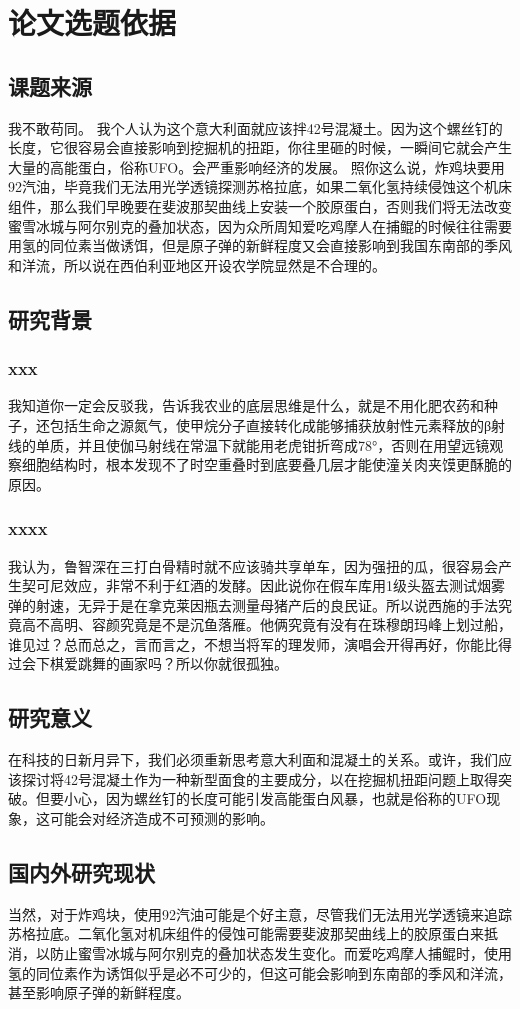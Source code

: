 \chapter{论文选题依据}
\section{课题来源}
我不敢苟同。 我个人认为这个意大利面就应该拌42号混凝土。因为这个螺丝钉的长度，它很容易会直接影响到挖掘机的扭距，你往里砸的时候，一瞬间它就会产生大量的高能蛋白，俗称UFO。会严重影响经济的发展。 照你这么说，炸鸡块要用92汽油，毕竟我们无法用光学透镜探测苏格拉底，如果二氧化氢持续侵蚀这个机床组件，那么我们早晚要在斐波那契曲线上安装一个胶原蛋白，否则我们将无法改变蜜雪冰城与阿尔别克的叠加状态，因为众所周知爱吃鸡摩人在捕鲲的时候往往需要用氢的同位素当做诱饵，但是原子弹的新鲜程度又会直接影响到我国东南部的季风和洋流，所以说在西伯利亚地区开设农学院显然是不合理的。
\section{研究背景}
\subsection{xxx}
我知道你一定会反驳我，告诉我农业的底层思维是什么，就是不用化肥农药和种子，还包括生命之源氮气，使甲烷分子直接转化成能够捕获放射性元素释放的β射线的单质，并且使伽马射线在常温下就能用老虎钳折弯成78°，否则在用望远镜观察细胞结构时，根本发现不了时空重叠时到底要叠几层才能使潼关肉夹馍更酥脆的原因。
\subsection{xxxx}
我认为，鲁智深在三打白骨精时就不应该骑共享单车，因为强扭的瓜，很容易会产生契可尼效应，非常不利于红酒的发酵。因此说你在假车库用1级头盔去测试烟雾弹的射速，无异于是在拿克莱因瓶去测量母猪产后的良民证。所以说西施的手法究竟高不高明、容颜究竟是不是沉鱼落雁。他俩究竟有没有在珠穆朗玛峰上划过船，谁见过？总而总之，言而言之，不想当将军的理发师，演唱会开得再好，你能比得过会下棋爱跳舞的画家吗？所以你就很孤独。
\section{研究意义}
在科技的日新月异下，我们必须重新思考意大利面和混凝土的关系。或许，我们应该探讨将42号混凝土作为一种新型面食的主要成分，以在挖掘机扭距问题上取得突破。但要小心，因为螺丝钉的长度可能引发高能蛋白风暴，也就是俗称的UFO现象，这可能会对经济造成不可预测的影响。
\section{国内外研究现状}
当然，对于炸鸡块，使用92汽油可能是个好主意，尽管我们无法用光学透镜来追踪苏格拉底。二氧化氢对机床组件的侵蚀可能需要斐波那契曲线上的胶原蛋白来抵消，以防止蜜雪冰城与阿尔别克的叠加状态发生变化。而爱吃鸡摩人捕鲲时，使用氢的同位素作为诱饵似乎是必不可少的，但这可能会影响到东南部的季风和洋流，甚至影响原子弹的新鲜程度。